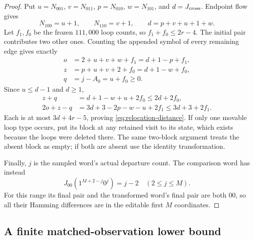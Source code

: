 \begin{proof}
Put $u=N_{001}$, $v=N_{011}$, $p=N_{010}$, $w=N_{101}$, and
$d=J_{\rm cross}$. Endpoint flow gives
\[
 N_{100}=u+1,\qquad N_{110}=v+1,\qquad
 d=p+v+u+1+w.
\]
Let $f_1,f_0$ be the frozen $111,000$ loop counts, so
$f_1+f_0\le2r-4$. The initial pair contributes two other ones.
Counting the appended symbol of every remaining edge gives exactly
\begin{align*}
 o&=2+u+v+w+f_1=d+1-p+f_1,\\
 z&=p+u+v+2+f_0=d+1-w+f_0,\\
 q&=j-A_0=u+f_0\ge0.
\end{align*}
Since $u\le d-1$ and $d\ge1$,
\begin{align*}
 z+q&=d+1-w+u+2f_0\le2d+2f_0,\\
 2o+z-q&=3d+3-2p-w-u+2f_1\le3d+3+2f_1.
\end{align*}
Each is at most $3d+4r-5$, proving \eqref{eq:relocation-distance}.
If only one movable loop type occurs, put its block at any retained
visit to its state, which exists because the loops were deleted there.
The same two-block argument treats the absent block as empty; if both
are absent use the identity transformation.

Finally, $j$ is the sampled word's actual departure count. The comparison
word has instead
\begin{equation}
 J_{00}(1^{M+2-j}0^j)=j-2\quad(2\le j\le M).
 \label{eq:null-suffix-shift}
\end{equation}
For this range its final pair and the transformed word's final pair are
both $00$, so all their Hamming differences are in the editable first
$M$ coordinates.
\end{proof}

\subsection{A finite matched-observation lower bound}

